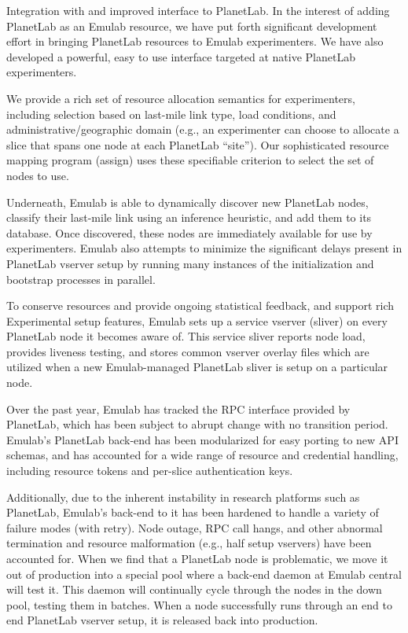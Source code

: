 \begin{asparadesc}

\item[Integration with and improved interface to PlanetLab.]
%
In the interest of adding PlanetLab as an Emulab resource, we have put forth
significant development effort in bringing PlanetLab resources to Emulab
experimenters.  We have also developed a powerful, easy to use interface
targeted at native PlanetLab experimenters.

We provide a rich set of resource allocation semantics for experimenters,
including selection based on last-mile link type, load conditions, and
administrative/geographic domain (e.g., an experimenter can choose to allocate
a slice that spans one node at each PlanetLab ``site'').  Our sophisticated
resource mapping program (assign) uses these specifiable criterion to select
the set of nodes to use.

Underneath, Emulab is able to dynamically discover new PlanetLab nodes,
classify their last-mile link using an inference heuristic, and add them to its
database.  Once discovered, these nodes are immediately available for use by
experimenters.  Emulab also attempts to minimize the significant delays present
in PlanetLab vserver setup by running many instances of the initialization and
bootstrap processes in parallel.

To conserve resources and provide ongoing statistical feedback, and support
rich Experimental setup features, Emulab sets up a service vserver (sliver) on
every PlanetLab node it becomes aware of.  This service sliver reports node
load, provides liveness testing, and stores common vserver overlay files which
are utilized when a new Emulab-managed PlanetLab sliver is setup on a
particular node.

Over the past year, Emulab has tracked the RPC interface provided by PlanetLab,
which has been subject to abrupt change with no transition period.  Emulab's
PlanetLab back-end has been modularized for easy porting to new API schemas,
and has accounted for a wide range of resource and credential handling,
including resource tokens and per-slice authentication keys.

Additionally, due to the inherent instability in research platforms such as
PlanetLab, Emulab's back-end to it has been hardened to handle a variety of
failure modes (with retry).  Node outage, RPC call hangs, and other abnormal
termination and resource malformation (e.g., half setup vservers) have been
accounted for.  When we find that a PlanetLab node is problematic, we move it
out of production into a special pool where a back-end daemon at Emulab central
will test it.  This daemon will continually cycle through the nodes in the down
pool, testing them in batches.  When a node successfully runs through an end to
end PlanetLab vserver setup, it is released back into production.


\end{asparadesc}
